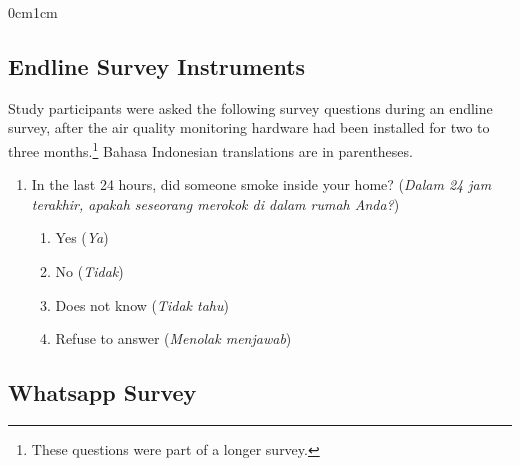 \documentclass[9pt,twoside]{pnas-new}
\begin{document}
\begin{adjustwidth}{0cm}{1cm}
\begin{enumerate}
\end{enumerate}


\subsection*{Endline Survey Instruments}

Study participants were asked the following survey questions during an endline survey, after the air quality monitoring hardware had been installed for two to three months.\footnote{These questions were part of a longer survey.} Bahasa Indonesian translations are in parentheses.

\begin{enumerate}
    \item In the last 24 hours, did someone smoke inside your home?	(\textit{Dalam 24 jam terakhir, apakah seseorang merokok di dalam rumah Anda?})
    \begin{enumerate}
        \item Yes (\textit{Ya})
        \item No (\textit{Tidak})
         \item Does not know (\textit{Tidak tahu})
        \item Refuse to answer (\textit{Menolak menjawab})
    \end{enumerate}
    
\end{enumerate}

\subsection*{Whatsapp Survey}


\end{adjustwidth}
\end{document}
